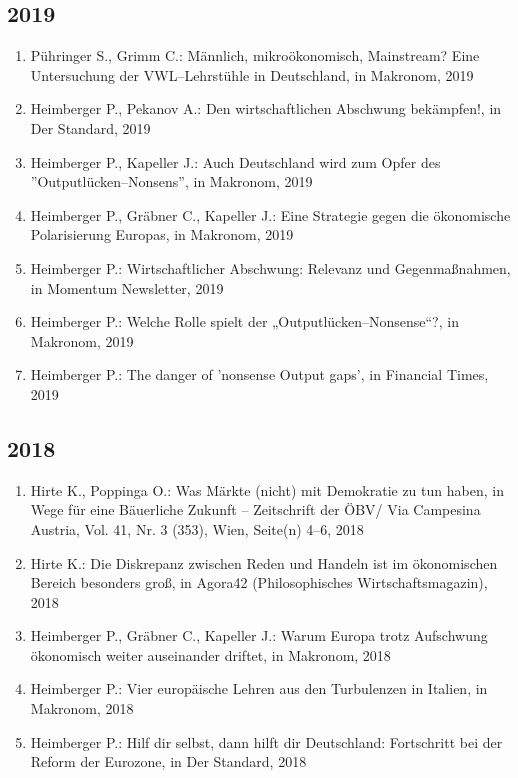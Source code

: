 \subsection*{2019}
\begin{enumerate}
    	 \item Pühringer S., Grimm C.: Männlich, mikroökonomisch, Mainstream? Eine Untersuchung der VWL--Lehrstühle in Deutschland, in Makronom, 2019
	 \item Heimberger P., Pekanov A.: Den wirtschaftlichen Abschwung bekämpfen!, in Der Standard, 2019
	 \item Heimberger P., Kapeller J.: Auch Deutschland wird zum Opfer des ''Outputlücken--Nonsens'', in Makronom, 2019
	 \item Heimberger P., Gräbner C., Kapeller J.: Eine Strategie gegen die ökonomische Polarisierung Europas, in Makronom, 2019
	 \item Heimberger P.: Wirtschaftlicher Abschwung: Relevanz und Gegenmaßnahmen, in Momentum Newsletter, 2019
	 \item Heimberger P.: Welche Rolle spielt der „Outputlücken--Nonsense“?, in Makronom, 2019
	 \item Heimberger P.: The danger of  'nonsense Output gaps', in Financial Times, 2019
\end{enumerate}
\subsection*{2018}
\begin{enumerate}
    	 \item Hirte K., Poppinga O.: Was Märkte (nicht) mit Demokratie zu tun haben, in Wege für eine Bäuerliche Zukunft – Zeitschrift der ÖBV/ Via Campesina Austria, Vol. 41, Nr. 3 (353), Wien, Seite(n) 4--6, 2018
	 \item Hirte K.: Die Diskrepanz zwischen Reden und Handeln ist im ökonomischen Bereich besonders groß, in Agora42 (Philosophisches Wirtschaftsmagazin), 2018
	 \item Heimberger P., Gräbner C., Kapeller J.: Warum Europa trotz Aufschwung ökonomisch weiter auseinander driftet, in Makronom, 2018
	 \item Heimberger P.: Vier europäische Lehren aus den Turbulenzen in Italien, in Makronom, 2018
	 \item Heimberger P.: Hilf dir selbst, dann hilft dir Deutschland: Fortschritt bei der Reform der Eurozone, in Der Standard, 2018
\end{enumerate}
